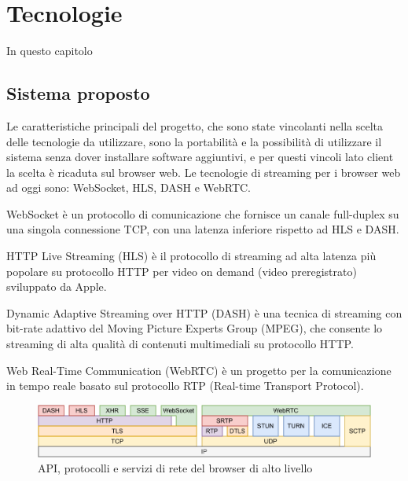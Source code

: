 %
%
\chapter{Tecnologie}

In questo capitolo 

\section{Sistema proposto}
Le caratteristiche principali del progetto, che sono state vincolanti nella scelta delle tecnologie da utilizzare, sono la portabilità e la possibilità di utilizzare il sistema senza dover installare software aggiuntivi, e per questi vincoli lato client la scelta è ricaduta sul browser web. Le tecnologie di streaming per i browser web ad oggi sono: WebSocket, HLS, DASH e WebRTC\cite{Audio_and_video_delivery}.

WebSocket è un protocollo di comunicazione che fornisce un canale full-duplex su una singola connessione TCP, con una latenza inferiore rispetto ad HLS e DASH.

HTTP Live Streaming (HLS) è il protocollo di streaming ad alta latenza più popolare su protocollo HTTP per video on demand (video preregistrato) sviluppato da Apple.

Dynamic Adaptive Streaming over HTTP (DASH) è una tecnica di streaming con bit-rate adattivo del Moving Picture Experts Group (MPEG), che consente lo streaming di alta qualità di contenuti multimediali su protocollo HTTP.

Web Real-Time Communication (WebRTC) è un progetto per la comunicazione in tempo reale basato sul protocollo RTP (Real-time Transport Protocol)\cite{High_Performance_Browser_Networking}.

\begin{figure}[H]
	\includegraphics[width=\linewidth]{immagini/webprotocols}
	\caption{API, protocolli e servizi di rete del browser di alto livello}
	\label{fig:webprotocols}
\end{figure}

